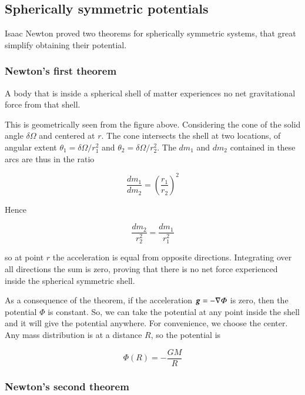 \subsection{Spherically symmetric potentials}

Isaac Newton proved two theorems for spherically symmetric systems, that great simplify obtaining their potential.

\subsubsection{Newton's first theorem}

A body that is inside a spherical shell of matter experiences no net gravitational force from that shell. 

This is geometrically seen from the figure above. Considering the cone of the solid angle $\delta \Omega$ and centered at $r$. The cone intersects the shell at two locations, of angular extent $\theta_1=\delta \Omega/r_1^2$ and $\theta_2=\delta \Omega/r_2^2$. The $dm_1$ and $dm_2$ contained in these arcs are thus in the ratio  


\begin{equation}
\frac{dm_1}{dm_2} = \left(\frac{r_1}{r_2}\right)^2
\end{equation}

Hence

\begin{equation}
\frac{dm_2}{r_2^2} = \frac{dm_1}{r_1^2} 
\end{equation}

so at point $r$ the acceleration is equal from opposite directions. Integrating over all directions the sum is zero, proving that there is no net force experienced inside the spherical symmetric shell. 

As a consequence of the theorem, if the acceleration ${\boldsymbol{g}}=-\nabla\varPhi$ is zero, then the potential $\varPhi$ is constant. So, we can take the potential at any point inside the shell and it will give the potential anywhere. For convenience, we choose the center. Any mass distribution is at a distance $R$, so the potential is 

\begin{equation}
\boxed{\varPhi(R) = - \frac{GM}{R}}
\end{equation}


\subsubsection{Newton's second theorem}

